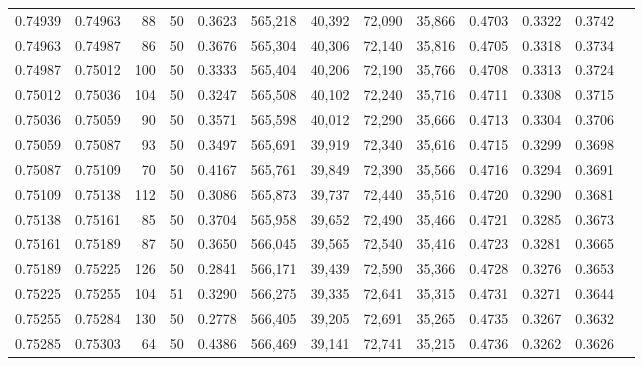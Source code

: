 \begin{tabular}{rrrrrrrrrrrrr}
0.74939 & 0.74963 &    88 &  50 &                                     0.3623 & 565,218 &  40,392 &  72,090 &  35,866 & 0.4703 & 0.3322 & 0.3742 \\
0.74963 & 0.74987 &    86 &  50 &                                     0.3676 & 565,304 &  40,306 &  72,140 &  35,816 & 0.4705 & 0.3318 & 0.3734 \\
0.74987 & 0.75012 &   100 &  50 &                                     0.3333 & 565,404 &  40,206 &  72,190 &  35,766 & 0.4708 & 0.3313 & 0.3724 \\
0.75012 & 0.75036 &   104 &  50 &                                     0.3247 & 565,508 &  40,102 &  72,240 &  35,716 & 0.4711 & 0.3308 & 0.3715 \\
0.75036 & 0.75059 &    90 &  50 &                                     0.3571 & 565,598 &  40,012 &  72,290 &  35,666 & 0.4713 & 0.3304 & 0.3706 \\
0.75059 & 0.75087 &    93 &  50 &                                     0.3497 & 565,691 &  39,919 &  72,340 &  35,616 & 0.4715 & 0.3299 & 0.3698 \\
0.75087 & 0.75109 &    70 &  50 &                                     0.4167 & 565,761 &  39,849 &  72,390 &  35,566 & 0.4716 & 0.3294 & 0.3691 \\
0.75109 & 0.75138 &   112 &  50 &                                     0.3086 & 565,873 &  39,737 &  72,440 &  35,516 & 0.4720 & 0.3290 & 0.3681 \\
0.75138 & 0.75161 &    85 &  50 &                                     0.3704 & 565,958 &  39,652 &  72,490 &  35,466 & 0.4721 & 0.3285 & 0.3673 \\
0.75161 & 0.75189 &    87 &  50 &                                     0.3650 & 566,045 &  39,565 &  72,540 &  35,416 & 0.4723 & 0.3281 & 0.3665 \\
0.75189 & 0.75225 &   126 &  50 &                                     0.2841 & 566,171 &  39,439 &  72,590 &  35,366 & 0.4728 & 0.3276 & 0.3653 \\
0.75225 & 0.75255 &   104 &  51 &                                     0.3290 & 566,275 &  39,335 &  72,641 &  35,315 & 0.4731 & 0.3271 & 0.3644 \\
0.75255 & 0.75284 &   130 &  50 &                                     0.2778 & 566,405 &  39,205 &  72,691 &  35,265 & 0.4735 & 0.3267 & 0.3632 \\
0.75285 & 0.75303 &    64 &  50 &                                     0.4386 & 566,469 &  39,141 &  72,741 &  35,215 & 0.4736 & 0.3262 & 0.3626 \\

\end{tabular}
